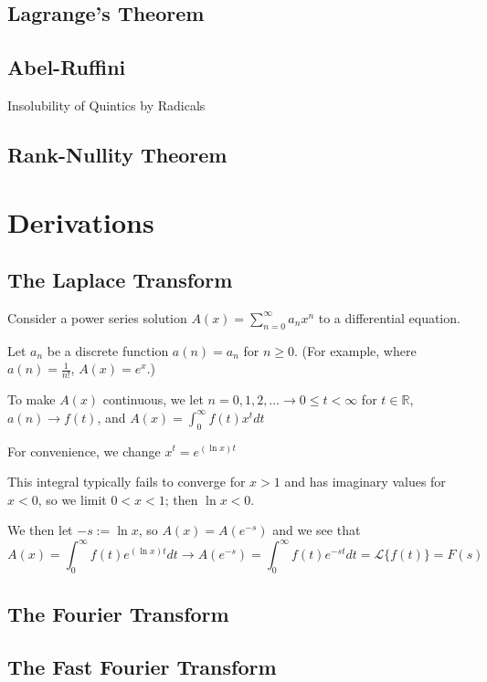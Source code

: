 \subsection{Lagrange's Theorem}

\subsection{Abel-Ruffini}

Insolubility of Quintics by Radicals

\subsection{Rank-Nullity Theorem}

\section{Derivations}

\subsection{The Laplace Transform}

	Consider a power series solution $A(x) = \sum_{n=0}^{\infty} a_nx^n$ to a differential equation.

	Let $a_n$ be a discrete function $a(n) = a_n$ for $n \geq 0$. (For example, where $a(n) = \frac{1}{n!}$, $A(x) = e^x$.)

	To make $A(x)$ continuous, we let $n = 0, 1, 2, \ldots \to 0 \leq t < \infty$ for $t \in \mathbb{R}$, $a(n) \to f(t)$, and $A(x) = \displaystyle{\int_{0}^{\infty} f(t)x^{t} dt}$

	For convenience, we change $x^t = e^{(\ln{x})t}$

	This integral typically fails to converge for $x > 1$ and has imaginary values for $x < 0$, so we limit $0 < x < 1$; then $\ln{x} < 0$.

	We then let $-s := \ln{x}$, so $A(x) = A(e^{-s})$ and we see that $$A(x) = \displaystyle{\int_{0}^{\infty} f(t)e^{(\ln{x})t} dt} \to A(e^{-s}) = \displaystyle{\int_{0}^{\infty} f(t)e^{-st} dt} = \mathscr{L}\{f(t)\} = F(s)$$

\subsection{The Fourier Transform}

\subsection{The Fast Fourier Transform}


